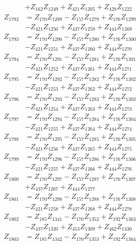 \begin{multicols}{2}
\begin{align}
&+ Z_{162}Z_{1249} + Z_{421}Z_{1205} + Z_{428}Z_{1222} \nonumber \\
Z_{1792} &= Z_{170}Z_{1289} - Z_{157}Z_{1279} + Z_{176}Z_{1299}  \nonumber \\
&- Z_{421}Z_{1250} + Z_{437}Z_{1259} + Z_{444}Z_{1269} \nonumber \\
Z_{1793} &= Z_{170}Z_{1290} - Z_{157}Z_{1280} + Z_{176}Z_{1300}  \nonumber \\
&- Z_{421}Z_{1251} + Z_{437}Z_{1260} + Z_{444}Z_{1270} \nonumber \\
Z_{1794} &= Z_{170}Z_{1291} - Z_{157}Z_{1281} + Z_{176}Z_{1301}  \nonumber \\
&- Z_{421}Z_{1252} + Z_{437}Z_{1261} + Z_{444}Z_{1271} \nonumber \\
Z_{1795} &= Z_{170}Z_{1292} - Z_{157}Z_{1282} + Z_{176}Z_{1302}  \nonumber \\
&- Z_{421}Z_{1253} + Z_{437}Z_{1262} + Z_{444}Z_{1272} \nonumber \\
Z_{1796} &= Z_{170}Z_{1293} - Z_{157}Z_{1283} + Z_{176}Z_{1303}  \nonumber \\
&- Z_{421}Z_{1254} + Z_{437}Z_{1263} + Z_{444}Z_{1273} \nonumber \\
Z_{1797} &= Z_{170}Z_{1294} - Z_{157}Z_{1284} + Z_{176}Z_{1304}  \nonumber \\
&- Z_{421}Z_{1255} + Z_{437}Z_{1264} + Z_{444}Z_{1274} \nonumber \\
Z_{1798} &= Z_{170}Z_{1295} - Z_{157}Z_{1285} + Z_{176}Z_{1305}  \nonumber \\
&- Z_{421}Z_{1256} + Z_{437}Z_{1265} + Z_{444}Z_{1275} \nonumber \\
Z_{1799} &= Z_{170}Z_{1296} - Z_{157}Z_{1286} + Z_{176}Z_{1306}  \nonumber \\
&- Z_{421}Z_{1257} + Z_{437}Z_{1266} + Z_{444}Z_{1276} \nonumber \\
Z_{1800} &= Z_{170}Z_{1297} - Z_{157}Z_{1287} + Z_{176}Z_{1307}  \nonumber \\
&+ Z_{437}Z_{1267} + Z_{444}Z_{1277} \nonumber \\
Z_{1801} &= Z_{170}Z_{1298} - Z_{157}Z_{1288} + Z_{176}Z_{1308}  \nonumber \\
&- Z_{421}Z_{1258} + Z_{437}Z_{1268} + Z_{444}Z_{1278} \nonumber \\
Z_{1802} &= Z_{185}Z_{1341} - Z_{170}Z_{1352} + Z_{192}Z_{1363}  \nonumber \\
&- Z_{437}Z_{1320} + Z_{453}Z_{1309} + Z_{462}Z_{1330} \nonumber \\
Z_{1803} &= Z_{185}Z_{1342} - Z_{170}Z_{1353} + Z_{192}Z_{1364}  \nonumber \\

\end{align}
\end{multicols}

